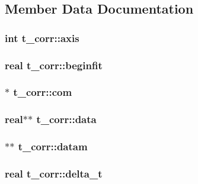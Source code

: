 \subsection{\-Member \-Data \-Documentation}
\hypertarget{structt__corr_a4124143de7c6b7c03a04806bde19bcd0}{
\subsubsection[{axis}]{\setlength{\rightskip}{0pt plus 5cm}int {\bf t\-\_\-corr\-::axis}}}\label{structt__corr_a4124143de7c6b7c03a04806bde19bcd0}
\hypertarget{structt__corr_aaa5b4129fe078f777e1bbc6f052d1e76}{
\subsubsection[{beginfit}]{\setlength{\rightskip}{0pt plus 5cm}real {\bf t\-\_\-corr\-::beginfit}}}\label{structt__corr_aaa5b4129fe078f777e1bbc6f052d1e76}
\hypertarget{structt__corr_a34d81b0c622385f030f1d4e7613072db}{
\subsubsection[{com}]{$\ast$ {\bf t\-\_\-corr\-::com}}}\label{structt__corr_a34d81b0c622385f030f1d4e7613072db}
\hypertarget{structt__corr_adaa8f1a191634190366239ec504f2b2e}{
\subsubsection[{data}]{\setlength{\rightskip}{0pt plus 5cm}real$\ast$$\ast$ {\bf t\-\_\-corr\-::data}}}\label{structt__corr_adaa8f1a191634190366239ec504f2b2e}
\hypertarget{structt__corr_a44bf948e74d6e900e75c5dadcc524572}{
\subsubsection[{datam}]{$\ast$$\ast$ {\bf t\-\_\-corr\-::datam}}}\label{structt__corr_a44bf948e74d6e900e75c5dadcc524572}
\hypertarget{structt__corr_a5c53b3192274fffe11f64414764c3155}{
\subsubsection[{delta\-\_\-t}]{\setlength{\rightskip}{0pt plus 5cm}real {\bf t\-\_\-corr\-::delta\-\_\-t}}}\label{structt__corr_a5c53b3192274fffe11f64414764c3155}
